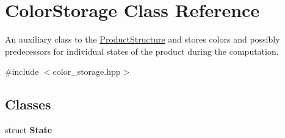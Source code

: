 \hypertarget{classColorStorage}{\section{\-Color\-Storage \-Class \-Reference}
\label{classColorStorage}
}


\-An auxiliary class to the \hyperlink{classProductStructure}{\-Product\-Structure} and stores colors and possibly predecessors for individual states of the product during the computation.  




{\ttfamily \#include $<$color\-\_\-storage.\-hpp$>$}

\subsection*{\-Classes}
\begin{DoxyCompactItemize}
\item 
struct {\bfseries \-State}
\end{DoxyCompactItemize}
